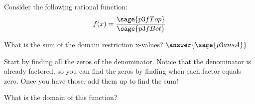 \documentclass{ximera}
\begin{document}
\begin{problem}
    Consider the following rational function:
    \[
        f(x) = \frac{\sage{p3fTop}}{\sage{p3fBot}}
    \]
    
    What is the sum of the domain restriction x-values? $\answer{\sage{p3ansA}}$
        \begin{feedback}
            Start by finding all the zeros of the denominator. Notice that the denominator is already factored, so you can find the zeros by finding when each factor equals zero. Once you have those, add them up to find the sum!
        \end{feedback}
    
    \begin{problem}
        What is the domain of this function?
        

\end{problem}
\end{problem}
\end{document}
